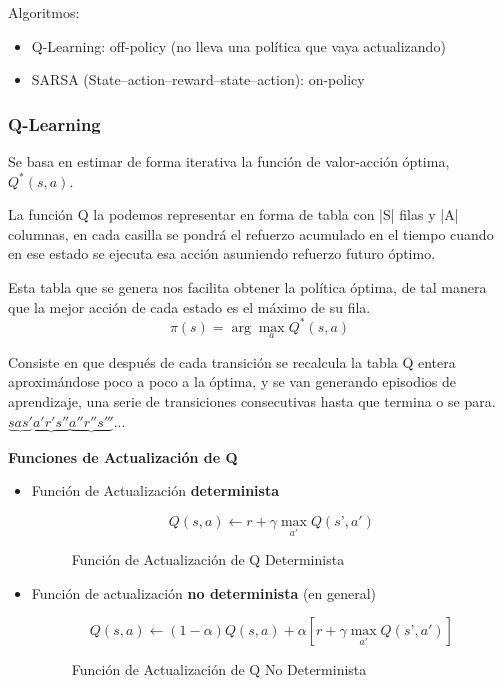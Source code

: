 \documentclass[12pt, twoside, openright]{report} %
\begin{document}
Algoritmos:
\begin{itemize}
	\item Q-Learning: off-policy (no lleva una política que vaya actualizando)
	\item SARSA (State–action–reward–state–action): on-policy
\end{itemize}

\subsubsection{Q-Learning}
Se basa en estimar de forma iterativa la función de valor-acción óptima, $Q^*(s, a)$.

La función Q la podemos representar en forma de tabla con |S| filas y |A| columnas, en cada casilla se pondrá el refuerzo acumulado en el tiempo cuando en ese estado se ejecuta esa acción asumiendo refuerzo futuro óptimo.

Esta tabla que se genera nos facilita obtener la política óptima, de tal manera que la mejor acción de cada estado es el máximo de su fila.
$$\pi(s) = \arg \max _a Q^* (s, a)$$

Consiste en que después de cada transición se recalcula la tabla Q entera aproximándose poco a poco a la óptima, y se van generando episodios de aprendizaje, una serie de transiciones consecutivas hasta que termina o se para. $\underbrace{sas'} \underbrace{a'r's''} \underbrace{a''r''s'''}...$

\textbf{Funciones de Actualización de Q}
\begin{itemize}
	\item Función de Actualización \textbf{determinista}
	      \begin{figure}[H]
		      $$Q(s, a) \leftarrow r + \gamma \max_{a'} Q(s’, a')$$

		      \captionsetup{justification=centering}
		      \caption{Función de Actualización de Q Determinista}
	      \end{figure}
	\item Función de actualización \textbf{no determinista} (en general)
	      \begin{figure}[H]
		      $$Q(s, a) \leftarrow (1-\alpha) Q(s, a) + \alpha[r + \gamma \max_{a'} Q(s’, a')]$$

		      \captionsetup{justification=centering}
		      \caption{Función de Actualización de Q No Determinista}
	      \end{figure}
\end{itemize}
\end{document}
